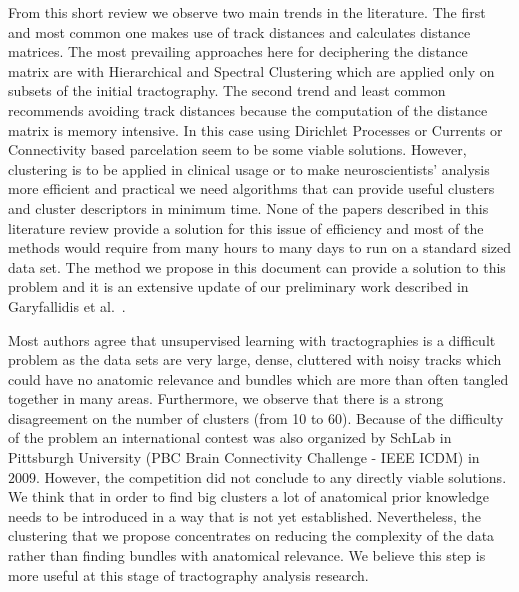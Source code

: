 \documentclass{bioinfo}
\begin{document}
From this short review we observe two main trends in the literature.
The first and most common one makes use of track distances and calculates
distance matrices. The most prevailing approaches here for deciphering
the distance matrix are with Hierarchical and Spectral Clustering
which are applied only on subsets of the initial tractography. The
second trend and least common recommends avoiding track distances
because the computation of the distance matrix is memory intensive.
In this case using Dirichlet Processes or Currents or Connectivity
based parcelation seem to be some viable solutions. However, clustering
is to be applied in clinical usage or to make neuroscientists' analysis
more efficient and practical we need algorithms that can provide useful
clusters and cluster descriptors in minimum time. None of the papers
described in this literature review provide a solution for this issue
of efficiency and most of the methods would require from many hours
to many days to run on a standard sized data set. The method we propose
in this document can provide a solution to this problem and it is
an extensive update of our preliminary work described in Garyfallidis
et al.~\cite{EGMB10}. 

Most authors agree that unsupervised learning with tractographies
is a difficult problem as the data sets are very large, dense, cluttered
with noisy tracks which could have no anatomic relevance and bundles
which are more than often tangled together in many areas. Furthermore,
we observe that there is a strong disagreement on the number of clusters
(from 10 to 60). Because of the difficulty of the problem an international
contest was also organized by SchLab in Pittsburgh University (PBC
Brain Connectivity Challenge - IEEE ICDM) in $2009$. However, the
competition did not conclude to any directly viable solutions. We
think that in order to find big clusters a lot of anatomical prior
knowledge needs to be introduced in a way that is not yet established.
Nevertheless, the clustering that we propose concentrates on reducing
the complexity of the data rather than finding bundles with anatomical
relevance. We believe this step is more useful at this stage of tractography
analysis research.
\end{document}

